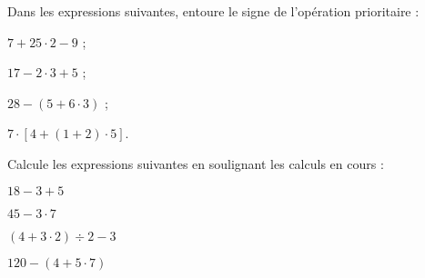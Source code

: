 \begin{methode*1}


\exercice 
Dans les expressions suivantes, entoure le signe de l'opération prioritaire :
\begin{colenumerate}{2}
 \item $7 + 25 \cdot 2 - 9$ ;
 \item $17 - 2 \cdot 3 + 5$ ;
 \item $28 - (5 + 6 \cdot 3)$ ;
 \item $7 \cdot [4  + (1 + 2) \cdot 5]$.
 \end{colenumerate}
 
 \exercice 
Calcule les expressions suivantes en soulignant les calculs en cours :
\begin{colenumerate}{2}
 \item $18 - 3 + 5$ \dotfill

\dotfill
 \item $45 - 3 \cdot 7$ \dotfill

\dotfill
 \item $(4 + 3 \cdot 2) \div 2 - 3$ \dotfill

\dotfill
 \item $120 - (4 + 5 \cdot 7)$ \dotfill

\dotfill
 \end{colenumerate}


\end{methode*1}


